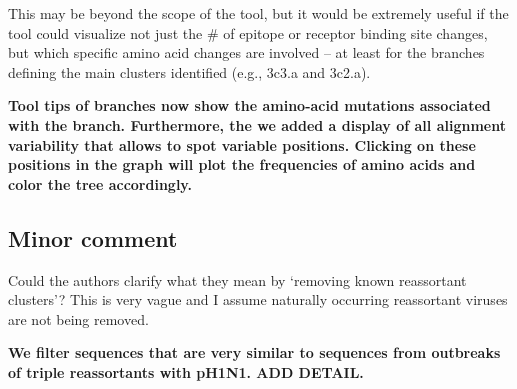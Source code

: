 \documentclass[11pt,oneside,letterpaper]{article}
\begin{document}
This may be beyond the scope of the tool, but it would be extremely useful if the tool could visualize not just the \# of epitope or receptor binding site changes, but which specific amino acid changes are involved -- at least for the branches defining the main clusters identified (e.g., 3c3.a and 3c2.a).

{\bf Tool tips of branches now show the amino-acid mutations associated with the branch. Furthermore, the we added a display of all alignment variability that allows to spot variable positions. Clicking on these positions in the graph will plot the frequencies of amino acids and color the tree accordingly. }

\subsection*{Minor comment}

Could the authors clarify what they mean by `removing known reassortant clusters'?  This is very vague and I assume naturally occurring reassortant viruses are not being removed.

{\bf We filter sequences that are very similar to sequences from outbreaks of triple reassortants with pH1N1. ADD DETAIL.}
\end{document}
